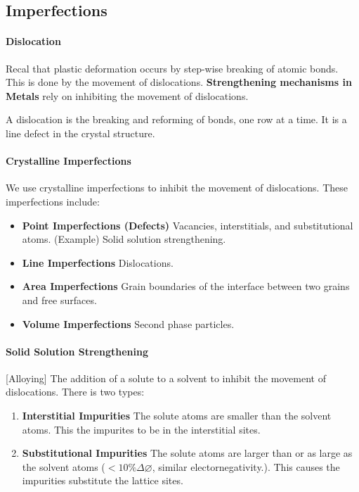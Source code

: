 \documentclass[11pt]{report}
\begin{document}
\subsection{Imperfections}
\paragraph{Dislocation} Recal that plastic deformation occurs by step-wise breaking of atomic bonds. This is done by the movement of dislocations. \textbf{Strengthening mechanisms in Metals} rely on inhibiting the movement of dislocations.
\begin{definition}[Dislocation]
    A dislocation is the breaking and reforming of bonds, one row at a time. It is a line defect in the crystal structure.
\end{definition}
\paragraph{Crystalline Imperfections} We use crystalline imperfections to inhibit the movement of dislocations. These imperfections include:
\begin{itemize}
    \item \textbf{Point Imperfections (Defects)} Vacancies, interstitials, and substitutional atoms.
    (Example) Solid solution strengthening.
    \item \textbf{Line Imperfections} Dislocations.
    \item \textbf{Area Imperfections} Grain boundaries of the interface between two grains and free surfaces.
    \item \textbf{Volume Imperfections} Second phase particles.
\end{itemize}
\paragraph{Solid Solution Strengthening} [Alloying] The addition of a solute to a solvent to inhibit the movement of dislocations. There is two types:
\begin{enumerate}
    \item \textbf{Interstitial Impurities} The solute atoms are smaller than the solvent atoms. This the impurites to be in the interstitial sites.
    \item \textbf{Substitutional Impurities} The solute atoms are larger than or as large as the solvent atoms ($<10 \% \Delta \varnothing$, similar electornegativity.). This causes the impurities substitute the lattice sites.
\end{enumerate}
\end{document}
